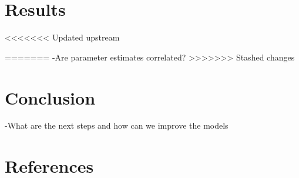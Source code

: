 \documentclass[11pt,preprint, authoryear]{elsarticle}
\numberwithin{equation}{section}
\numberwithin{figure}{section}
\numberwithin{table}{section}
\begin{document}
\section{Results}\label{results}

\textless{}\textless{}\textless{}\textless{}\textless{}\textless{}\textless{}
Updated upstream

======= -Are parameter estimates correlated?
\textgreater{}\textgreater{}\textgreater{}\textgreater{}\textgreater{}\textgreater{}\textgreater{}
Stashed changes

\section{Conclusion}\label{conclusion}

-What are the next steps and how can we improve the models

\section{References}\label{references}

\newpage
\nocite{*}

\end{document}
